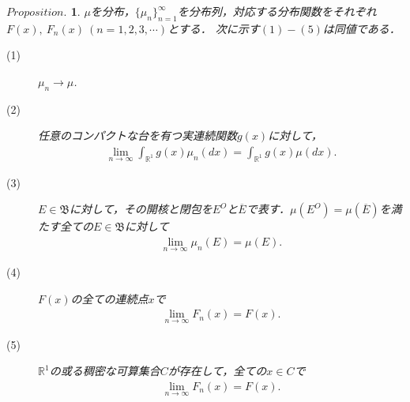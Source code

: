\documentclass[a4j,papersize,disablejfam,slide,14pt]{jsarticle}
\newtheorem{Prop}{$Proposition.$}
\begin{document}
    \begin{screen}
    	\begin{Prop}
        \label{Prop:convergence_distribution}
        	$\mu$を分布，$\{ \mu_n \}_{n=1}^{\infty}$を分布列，対応する分布関数をそれぞれ$F(x),\ F_n(x)\ (n=1,2,3,\cdots)$とする．
        	次に示す$(1)-(5)$は同値である．
            \begin{description}
            	\item[(1)]\qquad  $\mu_n \to \mu$.
                \item[(2)]\qquad 任意のコンパクトな台を有つ実連続関数$g(x)$に対して，
                	\begin{align}
                		\lim_{n \to \infty} \int_{\mathbb{R}^1} g(x) \mu_n(dx) = \int_{\mathbb{R}^1} g(x) \mu(dx).
                	\end{align}
                \item[(3)]\qquad $E \in \mathfrak{B}$に対して，その開核と閉包を$E^O$と$\overline{E}$で表す．$\mu(E^O) = \mu(\overline{E})$を満たす全ての$E \in \mathfrak{B}$に対して
                	\begin{align}
                		\lim_{n \to \infty} \mu_n(E) = \mu(E).
                	\end{align}
                \item[(4)]\qquad $F(x)$の全ての連続点$x$で
                	\begin{align}
                		\lim_{n \to \infty} F_n(x) = F(x).
                	\end{align}
                \item[(5)]\qquad $\mathbb{R}^1$の或る稠密な可算集合$C$が存在して，全ての$x \in C$で
                	\begin{align}
                    	\lim_{n \to \infty} F_n(x) = F(x).
                	\end{align}
            \end{description}
        \end{Prop}
    \end{screen}
\end{document}
